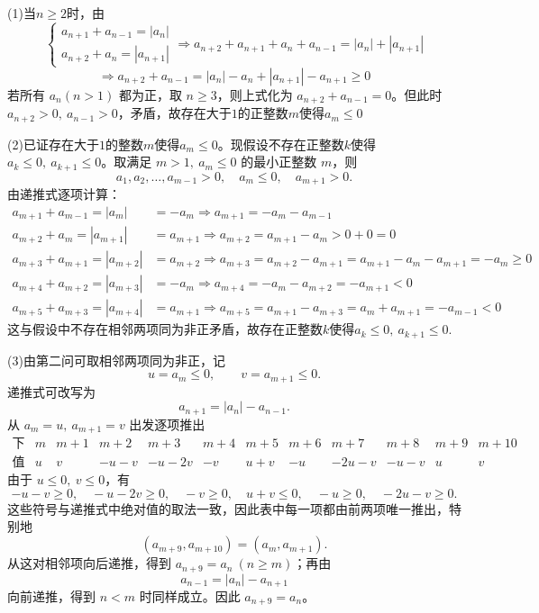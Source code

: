 \begin{solution}
    (1)当$n\ge 2$时，由\[
    \begin{cases}a_{n+1}+a_{n-1}=|a_n|\\a_{n+2}+a_{n}=|a_{n+1}|\end{cases}\Rightarrow a_{n+2}+a_{n+1}+a_n+a_{n-1}=|a_n|+|a_{n+1}|
    \]\[
    \Rightarrow a_{n+2}+a_{n-1}=|a_n|-a_n+|a_{n+1}|-a_{n+1}\ge 0
    \]
    若所有 $a_n(n>1)$ 都为正，取 $n\ge3$，则上式化为 $a_{n+2}+a_{n-1}=0$。但此时 $a_{n+2}>0,\ a_{n-1}>0$，矛盾，故存在大于$1$的正整数$m$使得$a_m\le 0$
 
    \noindent(2)已证存在大于$1$的整数$m$使得$a_m\le 0$。现假设不存在正整数$k$使得$a_k\le 0,~a_{k+1}\le 0$。取满足 $m>1,\ a_m\le0$ 的最小正整数 $m$，则
    \[
    a_1,a_2,\ldots,a_{m-1}>0,\quad a_m\le 0,\quad a_{m+1}>0.
    \]
    由递推式逐项计算：\vspace{-10pt}
    \begin{align*}
    a_{m+1}+a_{m-1}=|a_m|&=-a_m\Rightarrow a_{m+1}=-a_m-a_{m-1}\\
    a_{m+2}+a_m=|a_{m+1}|&=a_{m+1}\Rightarrow a_{m+2}=a_{m+1}-a_m>0+0=0\\
    a_{m+3}+a_{m+1}=|a_{m+2}|&=a_{m+2}\Rightarrow a_{m+3}=a_{m+2}-a_{m+1}=a_{m+1}-a_m-a_{m+1}=-a_m\geq 0\\
    a_{m+4}+a_{m+2}=|a_{m+3}|&=-a_{m}\Rightarrow a_{m+4}=-a_{m}-a_{m+2}=-a_{m+1}<0\\
    a_{m+5}+a_{m+3}=|a_{m+4}|&=a_{m+1}\Rightarrow a_{m+5}=a_{m+1}-a_{m+3}=a_m+a_{m+1}=-a_{m-1}<0
    \end{align*}
    这与假设中不存在相邻两项同为非正矛盾，故存在正整数$k$使得$a_k\le 0,~a_{k+1}\le 0$.

\noindent(3)由第二问可取相邻两项同为非正，记
\[
u=a_m\le0,\qquad v=a_{m+1}\le0.
\]
递推式可改写为
\[
a_{n+1}=|a_n|-a_{n-1}.
\]
从 $a_m=u,\ a_{m+1}=v$ 出发逐项推出
\[
\begin{array}{c|ccccccccccc}
\text{下标} & m&m+1&m+2&m+3&m+4&m+5&m+6&m+7&m+8&m+9&m+10\\
\hline
\text{值} & u&v&-u-v&-u-2v&-v&u+v&-u&-2u-v&-u-v&u&v
\end{array}
\]
由于 $u\le0,\ v\le0$，有
\[
-u-v\ge0,\quad -u-2v\ge0,\quad -v\ge0,\quad u+v\le0,\quad -u\ge0,\quad -2u-v\ge0.
\]
这些符号与递推式中绝对值的取法一致，因此表中每一项都由前两项唯一推出，特别地
\[
(a_{m+9},a_{m+10})=(a_m,a_{m+1}).
\]
从这对相邻项向后递推，得到 $a_{n+9}=a_n\ (n\ge m)$；再由
\[
a_{n-1}=|a_n|-a_{n+1}
\]
向前递推，得到 $n<m$ 时同样成立。因此 $a_{n+9}=a_n$。
\end{solution}
